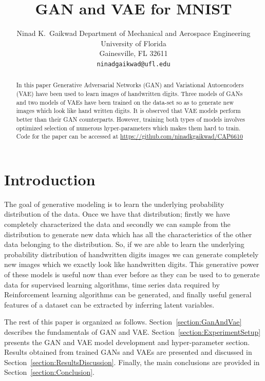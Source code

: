 \documentclass{article}
\title{GAN and VAE for MNIST}
\author{%
	Ninad K.~Gaikwad
	Department of Mechanical and Aerospace Engineering\\
	University of Florida\\
	Gainesville, FL 32611 \\
	\texttt{ninadgaikwad@ufl.edu} \\
}
\begin{document}
	
	\maketitle
	
	\begin{abstract}
	
	In this paper Generative Adversarial Networks (GAN) and Variational Autoencoders (VAE) have been used to learn images of handwritten digits. Three models of GANs and two models of VAEs have been trained on the data-set so as to generate new images which look like hand written digits. It is observed that VAE models perform better than their GAN counterparts. However, training both types of models involves optimized selection of numerous hyper-parameters which makes them hard to train. Code for the paper can be accessed at \url{https://github.com/ninadkgaikwad/CAP6610}
	
	\end{abstract}
	
	\section{Introduction}\label{section:Introduction}
	
	The goal of generative modeling is to learn the underlying probability distribution of the data. Once we have that distribution; firstly we have completely characterized the data and secondly we can sample from the distribution to generate new data which has all the characteristics of the other data belonging to the distribution. So, if we are able to learn the underlying probability distribution of handwritten digits images we can generate completely new images which we exactly look like handwritten digits. This generative power of these models is useful now than ever before as they can be used to to generate data for supervised learning algorithms, time series data required by Reinforcement learning algorithms can be generated, and finally useful general features of a dataset can be extracted by inferring latent variables.
	
	The rest of this paper is organized as follows. Section~\ref{section:GanAndVae} describes the fundamentals of GAN and VAE. Section~\ref{section:ExperimentSetup} presents the GAN and VAE model development and hyper-parameter section. Results obtained from trained GANs and VAEs are presented and discussed in Section~\ref{section:ResultsDiscussion}.  Finally, the main conclusions are provided in Section~\ref{section:Conclusion}.	
		
\end{document}
